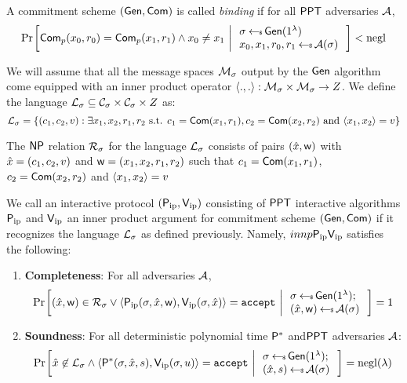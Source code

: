 \begin{definition}\label{defn:bindingcomm}
A commitment scheme $(\mathsf{Gen},\mathsf{Com})$ is called {\em binding} if for all $\mathsf{PPT}$ adversaries $\mathcal{A}$, 
\begin{align*}
\condprob{\com_p(x_0,r_0)=\com_p(x_1,r_1)\wedge x_0\neq x_1}{
\begin{array}{l}
\sigma\sample \gen(\secparam) \\
x_0,x_1,r_0,r_1 \sample \adv(\sigma)
\end{array}
} < \negl
\end{align*}

\end{definition}

We will assume that all the message spaces $\mathcal{M}_\sigma$ output by the $\mathsf{Gen}$ algorithm come equipped with an inner product operator $\langle .,.\rangle:\mathcal{M}_\sigma\times \mathcal{M}_\sigma\rightarrow Z$. We define the language $\mathcal{L}_\sigma\subseteq \mathcal{C}_\sigma\times \mathcal{C}_\sigma\times Z$ as:
\begin{equation*}
\mathcal{L}_\sigma = \{(c_1,c_2,v):\exists x_1,x_2,r_1,r_2 \text{ s.t. }
c_1=\mathsf{Com}(x_1,r_1), c_2=\mathsf{Com}(x_2,r_2) \text{ and } \langle x_1,x_2\rangle=v\} 
\end{equation*}

The $\mathsf{NP}$ relation $\mathcal{R}_\sigma$ for the language $\mathcal{L}_\sigma$ consists of pairs $(\hat{x},\mathsf{w})$ with $\hat{x}=(c_1,c_2,v)$ and $\mathsf{w}=(x_1,x_2,r_1,r_2)$ such that $c_1=\mathsf{Com}(x_1,r_1)$, $c_2=\mathsf{Com}(x_2,r_2)$ and $\langle x_1,x_2\rangle=v$ 

\begin{definition}\label{defn:innerproductarg}
We call an interactive protocol $(\mathsf{P}_\mathrm{ip},\mathsf{V}_\mathrm{ip})$ consisting of $\mathsf{PPT}$ interactive algorithms $\mathsf{P}_\mathrm{ip}$ and $\mathsf{V}_\mathrm{ip}$ an inner product argument for commitment scheme $(\mathsf{Gen},\mathsf{Com})$ if it recognizes the language $\mathcal{L}_\sigma$ as defined previously. Namely, $innp{\mathsf{P}_\mathrm{ip}}{\mathsf{V}_\mathrm{ip}}$ satisfies the following:
\begin{enumerate}[{\rm (i)}]
\item {\bf Completeness}: For all adversaries $\mathcal{A}$,
\begin{align*}
\condprob{(\stmt,\wit)\in \calR_\sigma \vee \langle \pip(\sigma,\stmt,\wit),\vip(\sigma,\stmt)\rangle={\tt accept}}{
\begin{array}{l}
\sigma\sample \gen(\secparam);\\
(\stmt,\wit)\sample \adv(\sigma)
\end{array}
}=1
\end{align*}

\item{\bf Soundness}: For all deterministic polynomial time $\mathsf{P}^*$ and$\mathsf{PPT}$ adversaries $\mathcal{A}$:
\begin{align*}
\condprob{\stmt\not\in \calL_\sigma \wedge \langle
\prover^*(\sigma,\stmt,s),\vip(\sigma,u)\rangle={\tt accept}}{
\begin{array}{l}
\sigma\sample \gen(\secparam);\\
(\stmt,s)\sample \adv(\sigma)
\end{array}
} = \negl(\lambda)
\end{align*}
\end{enumerate}
\end{definition}

